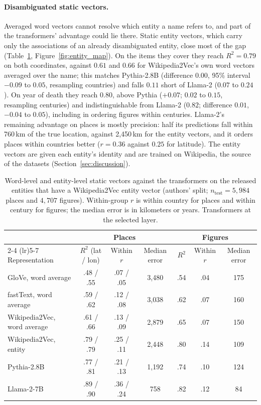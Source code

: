 \documentclass[11pt]{article}
\begin{document}
\paragraph{Disambiguated static vectors.}
Averaged word vectors cannot resolve which entity a name refers to, and part of the
transformers' advantage could lie there. Static entity vectors, which carry only the associations
of an already disambiguated entity, close most of the gap (Table~\ref{tab:entity}, Figure~\ref{fig:entity_map}). On the items
they cover they reach $R^2 = 0.79$ on both coordinates, against $0.61$ and $0.66$ for
Wikipedia2Vec's own word vectors averaged over the name; this matches Pythia-2.8B (difference
$0.00$, 95\% interval $-0.09$ to $0.05$, resampling countries) and falls $0.11$ short of
Llama-2 ($0.07$ to $0.24$). On year of death they reach $0.80$, above Pythia ($+0.07$; $0.02$ to
$0.15$, resampling centuries) and indistinguishable from Llama-2 ($0.82$; difference $0.01$,
$-0.04$ to $0.05$), including in ordering figures within centuries. Llama-2's remaining advantage
on places is mostly precision: half its predictions fall within 760\,km of the true location,
against 2{,}450\,km for the entity vectors, and it orders places within countries better
($r = 0.36$ against $0.25$ for latitude). The entity vectors are given each entity's identity and are trained on Wikipedia, the source of the datasets (Section~\ref{sec:discussion}).

\begin{table}[t]
  \centering
  \caption{Word-level and entity-level static vectors against the transformers on the released
  entities that have a Wikipedia2Vec entity vector (authors' split; $n_{\text{test}} = 5{,}984$
  places and $4{,}707$ figures). Within-group $r$ is within country for places and within century
  for figures; the median error is in kilometers or years. Transformers at the selected layer.}
  \label{tab:entity}
  \footnotesize
  \setlength{\tabcolsep}{4pt}
  \begin{tabular}{lcccccc}
    \toprule
    & \multicolumn{3}{c}{Places} & \multicolumn{3}{c}{Figures} \\
    \cmidrule(lr){2-4} \cmidrule(lr){5-7}
    Representation & $R^2$ (lat / lon) & Within $r$ & Median error & $R^2$ & Within $r$ & Median error \\
    \midrule
    GloVe, word average          & .48 / .55 & .07 / .05 & 3{,}480 & .54 & .04 & 175 \\
    fastText, word average       & .59 / .62 & .12 / .08 & 3{,}038 & .62 & .07 & 160 \\
    Wikipedia2Vec, word average  & .61 / .66 & .13 / .09 & 2{,}879 & .65 & .07 & 150 \\
    Wikipedia2Vec, entity        & .79 / .79 & .25 / .11 & 2{,}448 & .80 & .14 & 109 \\
    \midrule
    Pythia-2.8B                  & .77 / .81 & .21 / .13 & 1{,}192 & .74 & .10 & 124 \\
    Llama-2-7B                   & .89 / .90 & .36 / .24 & 758     & .82 & .12 & 84 \\
    \bottomrule
  \end{tabular}
\end{table}
\end{document}
